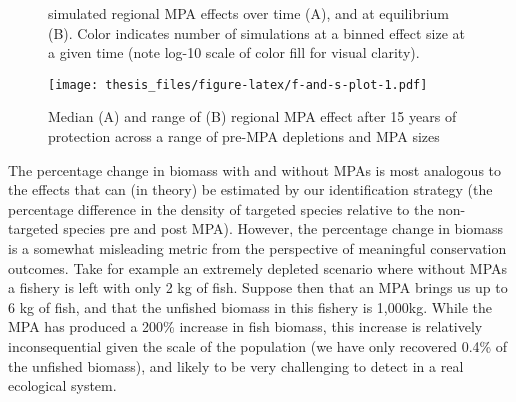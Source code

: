 \documentclass[twoside,12pt,final]{ucthesis-CA2012}
\begin{document}
\begin{ucmainmatter}
\begin{figure}
{simulated regional MPA effects over time (A), and at equilibrium (B).
Color indicates number of simulations at a binned effect size at a given
time (note log-10 scale of color fill for visual clarity).}
\end{figure}
\begin{figure}
\centering
\texttt{[image: thesis\_files/figure-latex/f-and-s-plot-1.pdf]}
\caption{\label{fig:f-and-s-plot}Median (A) and range of (B) regional MPA
effect after 15 years of protection across a range of pre-MPA depletions
and MPA sizes}
\end{figure}
The percentage change in biomass with and without MPAs is most analogous
to the effects that can (in theory) be estimated by our identification
strategy (the percentage difference in the density of targeted species
relative to the non-targeted species pre and post MPA). However, the
percentage change in biomass is a somewhat misleading metric from the
perspective of meaningful conservation outcomes. Take for example an
extremely depleted scenario where without MPAs a fishery is left with
only 2 kg of fish. Suppose then that an MPA brings us up to 6 kg of
fish, and that the unfished biomass in this fishery is 1,000kg. While
the MPA has produced a 200\% increase in fish biomass, this increase is
relatively inconsequential given the scale of the population (we have
only recovered 0.4\% of the unfished biomass), and likely to be very
challenging to detect in a real ecological system.


\end{ucmainmatter}
\end{document}
